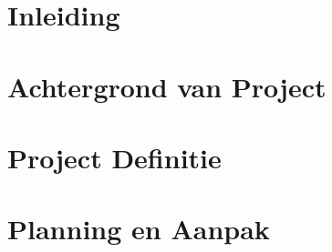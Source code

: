 \documentclass{../local}
\begin{document}
\clearpage{}

\chapter{Inleiding}


\newpage{}
\renewcommand{\thesection}{\arabic{section}}
\renewcommand*\contentsname{Inhoud}
\setlength{\cftbeforetoctitleskip}{-3em}
\tableofcontents

\clearpage

\chapter{Achtergrond van Project} 


\chapter{Project Definitie}


\chapter{Planning en Aanpak}






\end{document}
